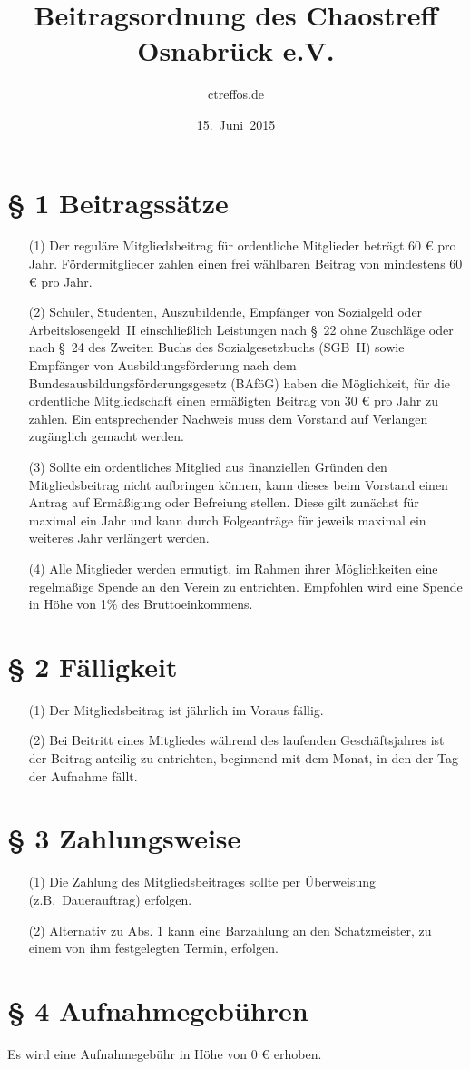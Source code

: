 \documentclass[a4paper,12pt]{scrartcl}
\title{Beitragsordnung des Chaostreff Osnabrück e.V.}
\author{ctreffos.de}
\date{15.~Juni~2015}
\begin{document}
\maketitle

\section*{\S{} 1 Beitragssätze}
\begin{enumerate}
\item[(1)]
Der reguläre Mitgliedsbeitrag für ordentliche Mitglieder beträgt 60 €
pro Jahr. Fördermitglieder zahlen einen frei wählbaren Beitrag von
mindestens 60 € pro Jahr.
\item[(2)]
Schüler, Studenten, Auszubildende, Empfänger von Sozialgeld oder
Arbeitslosengeld~II einschließlich Leistungen nach §~22 ohne Zuschläge
oder nach §~24 des Zweiten Buchs des Sozialgesetzbuchs (SGB~II) sowie
Empfänger von Ausbildungsförderung nach dem
Bundesausbildungsförderungsgesetz (BAföG) haben die Möglichkeit, für
die ordentliche Mitgliedschaft einen ermäßigten Beitrag von 30 € pro
Jahr zu zahlen. Ein entsprechender Nachweis muss dem Vorstand auf
Verlangen zugänglich gemacht werden.
\item[(3)]
Sollte ein ordentliches Mitglied aus finanziellen Gründen den
Mitgliedsbeitrag nicht aufbringen können, kann dieses beim Vorstand
einen Antrag auf Ermäßigung oder Befreiung stellen. Diese gilt
zunächst für maximal ein Jahr und kann durch Folgeanträge für jeweils
maximal ein weiteres Jahr verlängert werden.
\item[(4)]
Alle Mitglieder werden ermutigt, im Rahmen ihrer Möglichkeiten eine
regelmäßige Spende an den Verein zu entrichten. Empfohlen wird eine
Spende in Höhe von 1\% des Bruttoeinkommens.
\end{enumerate}

\section*{\S{} 2 Fälligkeit}
\begin{enumerate}
\item[(1)]
Der Mitgliedsbeitrag ist jährlich im Voraus fällig.
\item[(2)]
Bei Beitritt eines Mitgliedes während des laufenden Geschäftsjahres ist der Beitrag 
anteilig zu entrichten, beginnend mit dem Monat, in den der Tag der Aufnahme fällt.
\end{enumerate}

\section*{\S{} 3 Zahlungsweise}
\begin{enumerate}
\item[(1)]
Die Zahlung des Mitgliedsbeitrages sollte per Überweisung (z.B.\
Dauerauftrag) erfolgen.
\item[(2)]
Alternativ zu Abs. 1 kann eine Barzahlung an 
den Schatzmeister, zu einem von ihm festgelegten Termin, erfolgen.
\end{enumerate}

\section*{\S{} 4 Aufnahmegebühren}
Es wird eine Aufnahmegebühr in Höhe von 0 € erhoben.
\end{document}
